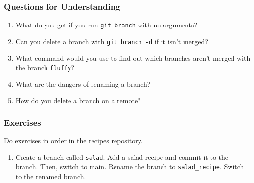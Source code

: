 \subsubsection{Questions for Understanding}
\begin{enumerate}
	\item What do you get if you run \verb`git branch` with no arguments?
	\item Can you delete a branch with \verb`git branch -d` if it isn't merged?
	\item What command would you use to find out which branches aren't merged with
	   the branch \verb`fluffy`?
	\item What are the dangers of renaming a branch?
	\item How do you delete a branch on a remote?
\end{enumerate}

\subsubsection{Exercises}
Do exercises in order in the recipes repository.
\begin{enumerate}
\item Create a branch called \verb`salad`.
   Add a salad recipe and commit it to the branch.
   Then, switch to main.
   Rename the branch to \verb`salad_recipe`.
   Switch to the renamed branch.
\end{enumerate}
